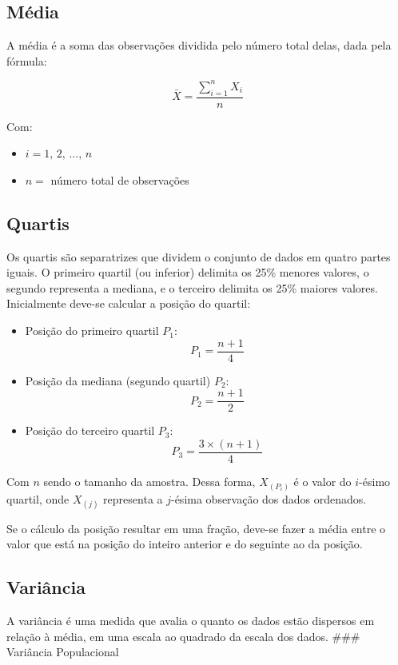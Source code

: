 \documentclass[
]{estat/estat}
\begin{document}
\subsection{Média}\label{muxe9dia}

A média é a soma das observações dividida pelo número total delas, dada
pela fórmula:

\[\bar{X}=\frac{\sum\limits_{i=1}^{n}X_i}{n}\]

Com:

\begin{itemize}
\item
  \(i = 1, \, 2, \, ..., \, n\)
\item
  \(n =\) número total de observações
\end{itemize}

\subsection{Quartis}\label{quartis}

Os quartis são separatrizes que dividem o conjunto de dados em quatro
partes iguais. O primeiro quartil (ou inferior) delimita os 25\% menores
valores, o segundo representa a mediana, e o terceiro delimita os 25\%
maiores valores. Inicialmente deve-se calcular a posição do quartil:

\begin{itemize}
\item
  Posição do primeiro quartil \(P_1\): \[P_1=\frac{n+1}{4}\]
\item
  Posição da mediana (segundo quartil) \(P_2\): \[P_2 = \frac{n+1}{2}\]
\item
  Posição do terceiro quartil \(P_3\): \[P_3=\frac{3 \times (n+1)}{4}\]
\end{itemize}

Com \(n\) sendo o tamanho da amostra. Dessa forma,
\(X_{\left( P_i \right)}\) é o valor do \(i\)-ésimo quartil, onde
\(X_{\left( j \right)}\) representa a \(j\)-ésima observação dos dados
ordenados.

Se o cálculo da posição resultar em uma fração, deve-se fazer a média
entre o valor que está na posição do inteiro anterior e do seguinte ao
da posição.

\subsection{Variância}\label{variuxe2ncia}

A variância é uma medida que avalia o quanto os dados estão dispersos em
relação à média, em uma escala ao quadrado da escala dos dados. \#\#\#
Variância Populacional
\end{document}
